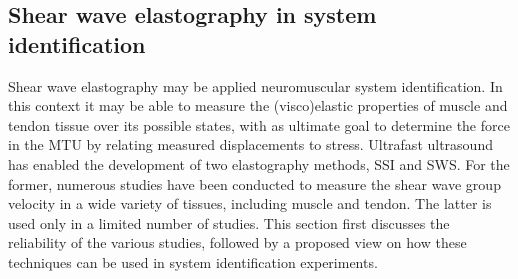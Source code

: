 \subsection{Shear wave elastography in system identification}
Shear wave elastography may be applied neuromuscular system identification. In this context it may be able to measure the (visco)elastic properties of muscle and tendon tissue over its possible states, with as ultimate goal to determine the force in the MTU by relating measured displacements to stress. 
Ultrafast ultrasound has enabled the development of two elastography methods, SSI and SWS. For the former, numerous studies have been conducted to measure the shear wave group velocity in a wide variety of tissues, including muscle and tendon. The latter is used only in a limited number of studies. This section first discusses the reliability of the various studies, followed by a proposed view on how these techniques can be used in system identification experiments. 



